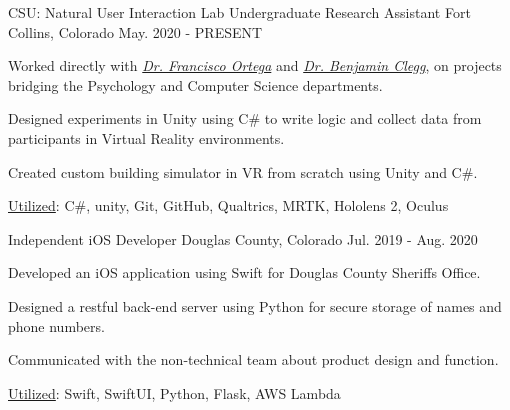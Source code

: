 

\begin{cventries}

  \cventry
    {CSU: Natural User Interaction Lab} %
    {Undergraduate Research Assistant} %
    {Fort Collins, Colorado} %
    {May. 2020 - PRESENT} %
    {
      \begin{cvitems} %
        \item {Worked directly with \textit{\href{https://compsci.colostate.edu/person/?id=22550A7530193FD205613DD09DD2EE6F&sq=t}{Dr. Francisco Ortega}} and \textit{\href{http://psywebserv.psych.colostate.edu/psylist/detail.asp?Num=15}{Dr. Benjamin Clegg}}, on projects bridging the Psychology and Computer Science departments.}
        \item {Designed experiments in Unity using C\# to write logic and collect data from participants in Virtual Reality environments.}
        \item {Created custom building simulator in VR from scratch using Unity and C\#.}
        \item {\underline{Utilized}:  C\#, unity,  Git,  GitHub,  Qualtrics, MRTK, Hololens 2, Oculus}
      \end{cvitems}
    }

  \cventry
    {Independent} %
    {iOS Developer} %
    {Douglas County, Colorado} %
    {Jul. 2019 - Aug. 2020} %
    {
      \begin{cvitems} %
        \item {Developed an iOS  application using Swift for Douglas County Sheriffs Office.}
        \item {Designed a restful  back-end server using Python for secure storage of names and phone numbers.}
        \item {Communicated with the non-technical team about product design and function.}
        \item {\underline{Utilized}:  Swift, SwiftUI,  Python, Flask, AWS Lambda}
      \end{cvitems}
    }


\end{cventries}
